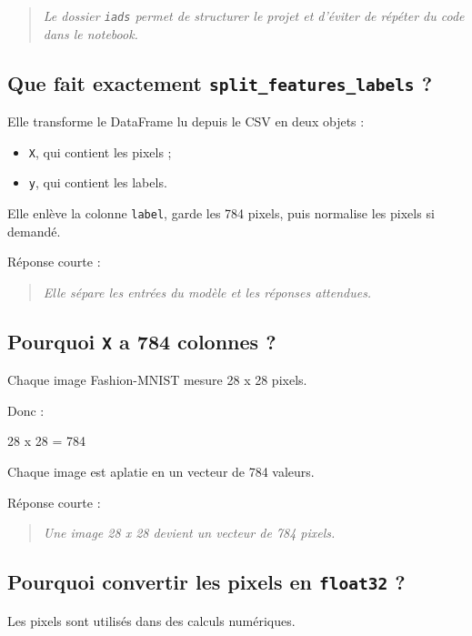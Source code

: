 \documentclass[11pt,a4paper]{article}
\begin{document}
\begin{quote}
\itshape Le dossier \texttt{iads} permet de structurer le projet et d'éviter de répéter du code dans le notebook.
\end{quote}

\subsection{Que fait exactement \texttt{split\_features\_labels} ?}

Elle transforme le DataFrame lu depuis le CSV en deux objets :

\begin{itemize}
\item \texttt{X}, qui contient les pixels ;
\item \texttt{y}, qui contient les labels.
\end{itemize}

Elle enlève la colonne \texttt{label}, garde les 784 pixels, puis normalise les pixels si demandé.

Réponse courte :

\begin{quote}
\itshape Elle sépare les entrées du modèle et les réponses attendues.
\end{quote}

\subsection{Pourquoi \texttt{X} a 784 colonnes ?}

Chaque image Fashion-MNIST mesure 28 x 28 pixels.

Donc :

\begin{codeblock}
28 x 28 = 784
\end{codeblock}

Chaque image est aplatie en un vecteur de 784 valeurs.

Réponse courte :

\begin{quote}
\itshape Une image 28 x 28 devient un vecteur de 784 pixels.
\end{quote}

\subsection{Pourquoi convertir les pixels en \texttt{float32} ?}

Les pixels sont utilisés dans des calculs numériques.
\end{document}
